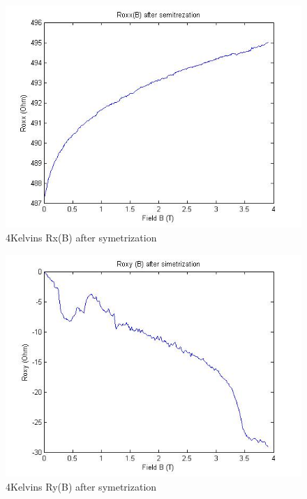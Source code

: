\documentclass[idxtotoc,hyperref,openany,oneside]{labbook} %
\begin{document}
\begin{figure}[H] %
\begin{center}
\includegraphics[width=1\linewidth]{7464kRoxx.jpg}
\end{center}
\caption{4Kelvins Rx(B)  after symetrization} 
\label{fig:fig8}
\end{figure}


\begin{figure}[H] %
\begin{center}
\includegraphics[width=1\linewidth]{7464kRoxy.jpg}
\end{center}
\caption{4Kelvins Ry(B)  after symetrization} 
\label{fig:fig9}
\end{figure}
\end{document}

